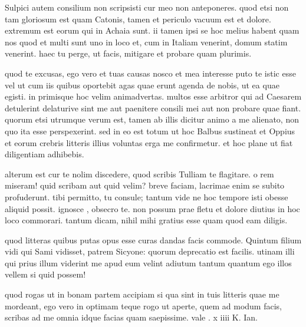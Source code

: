  Sulpici autem consilium non scripsisti cur meo non anteponeres. quod etsi non tam gloriosum est quam Catonis, tamen et periculo vacuum est et dolore. extremum est eorum qui in Achaia sunt. ii tamen ipsi se hoc melius habent quam nos quod et multi sunt uno in loco et, cum in Italiam venerint, domum statim venerint. haec tu perge, ut facis, mitigare et probare quam plurimis.

 quod te excusas, ego vero et tuas causas nosco et mea interesse puto te istic esse vel ut cum iis quibus oportebit agas quae erunt agenda de nobis, ut ea quae egisti. in primisque hoc velim animadvertas. multos esse arbitror qui ad Caesarem detulerint delaturive sint me aut paenitere consili mei aut non probare quae fiant. quorum etsi utrumque verum est, tamen ab illis dicitur animo a me alienato, non quo ita esse perspexerint. sed in eo est totum ut hoc Balbus sustineat et Oppius et eorum crebris litteris illius voluntas erga me confirmetur. et hoc plane ut fiat diligentiam adhibebis.

 alterum est cur te nolim discedere, quod scribis Tulliam te flagitare. o rem miseram! quid scribam aut quid velim? breve faciam, lacrimae enim se subito profuderunt. tibi permitto, tu consule; tantum vide ne hoc tempore isti obesse aliquid possit. ignosce , obsecro te. non possum prae fletu et dolore diutius in hoc loco commorari. tantum dicam, nihil mihi gratius esse quam quod eam diligis.

 quod litteras quibus putas opus esse curas dandas facis commode. Quintum filium vidi qui Sami vidisset, patrem Sicyone: quorum deprecatio est facilis. utinam illi qui prius illum viderint me apud eum velint adiutum tantum quantum ego illos vellem si quid possem!

 quod rogas ut in bonam partem accipiam si qua sint in tuis litteris quae me mordeant, ego vero in optimam teque rogo ut aperte, quem ad modum facis, scribas ad me omnia idque facias quam saepissime. vale . x iiii K. Ian.
